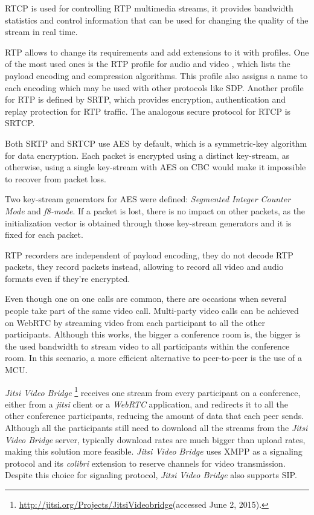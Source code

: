 \ac{RTCP} is used for controlling \ac{RTP} multimedia streams, it provides bandwidth statistics and control information that can be used for changing the quality of the stream in real time.

  \ac{RTP} allows to change its requirements and add extensions to it with profiles. One of the most used ones is the \ac{RTP} profile for audio and video \cite{rfc3551}, which lists the payload encoding and compression algorithms. This profile also assigns a name to each encoding which may be used with other protocols like \ac{SDP}.
  Another profile for \ac{RTP} is defined by \ac{SRTP}, which provides encryption, authentication and replay protection for \ac {RTP} traffic. The analogous secure protocol for \ac{RTCP} is \ac{SRTCP}.

  Both \ac{SRTP} and \ac{SRTCP} use \ac{AES} by default, which is a symmetric-key algorithm for data encryption. Each packet is encrypted using a distinct key-stream, as otherwise, using a single key-stream with \ac{AES} on \ac{CBC} would make it impossible to recover from packet loss.

  Two key-stream generators for \ac{AES} were defined: \emph{Segmented Integer Counter Mode} and \emph{f8-mode}. If a packet is lost, there is no impact on other packets, as the initialization vector is obtained through those key-stream generators and it is fixed for each packet.


  \ac{RTP} recorders are independent of payload encoding, they do not decode \ac{RTP} packets, they record packets instead, allowing to record all video and audio formats even if they're encrypted.

        Even though one on one calls are common, there are occasions when several people take part of the same video call.
	Multi-party video calls can be achieved on \ac{WebRTC} by streaming video from each participant to all the other participants. Although this works, the bigger a conference room is, the bigger is the used bandwidth to stream video to all participants within the conference room.
        In this scenario, a more efficient alternative to peer-to-peer is the use of a \ac{MCU}.

	\emph{Jitsi Video Bridge} \footnote{\url{http://jitsi.org/Projects/JitsiVideobridge}(accessed June 2, 2015).} receives one stream from every participant on a conference, either from a \emph{jitsi} client or a \emph{WebRTC} application, and redirects it to all the other conference participants, reducing the amount of data that each peer sends. Although all the participants still need to download all the streams from the \emph{Jitsi Video Bridge} server, typically download rates are much bigger than upload rates, making this solution more feasible.
	\emph{Jitsi Video Bridge} uses \ac{XMPP} as a signaling protocol and its \emph{colibri} extension \cite{xep0340} to reserve channels for video transmission. Despite this choice for signaling protocol, \emph{Jitsi Video Bridge} also supports \ac{SIP}.

